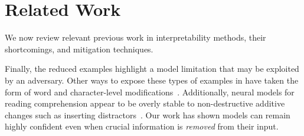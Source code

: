 \section{Related Work}
\label{sec:related}

We now review relevant previous work in interpretability methods, their
shortcomings, and mitigation techniques.

Finally, the reduced examples highlight a model limitation that may be
exploited by an adversary.  Other ways to expose these types of
examples in \nlp{} have taken the form of word and character-level
modifications~\cite{papernot2016crafting, ebrahimi2017hotflip,
belinkov2017synthetic}. Additionally, neural models for reading
comprehension appear to be overly stable to non-destructive additive
changes such as inserting distractors~\cite{jia2017adversarial}. Our
work has shown models can remain highly confident even when crucial
information is \emph{removed} from their input.

